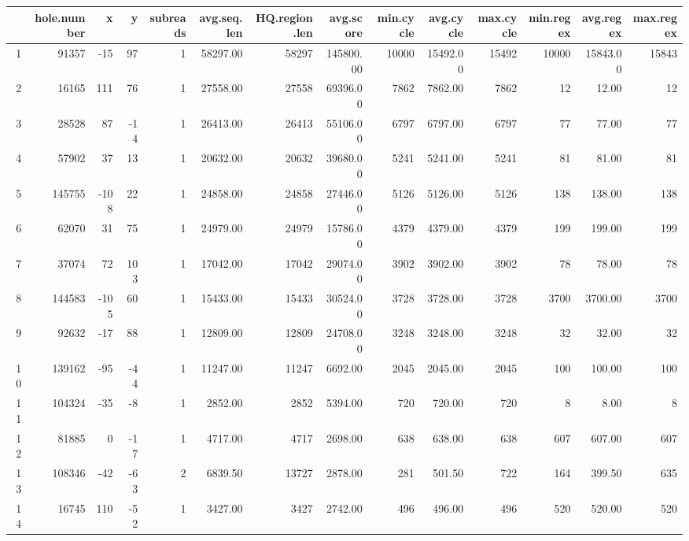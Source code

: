 \documentclass[notitlepage,a4paper]{article}\usepackage[]{graphicx}\usepackage[]{color}
\begin{document}
\begin{scriptsize}
\begin{landscape}
\begin{table}[ht]
\centering
\begin{tabular}{rrrrrrrrrrrrrr}
  \hline
 & hole.number & x & y & subreads & avg.seq.len & HQ.region.len & avg.score & min.cycle & avg.cycle & max.cycle & min.regex & avg.regex & max.regex \\ 
  \hline
1 & 91357 & -15 &  97 &   1 & 58297.00 & 58297 & 145800.00 & 10000 & 15492.00 & 15492 & 10000 & 15843.00 & 15843 \\ 
  2 & 16165 & 111 &  76 &   1 & 27558.00 & 27558 & 69396.00 & 7862 & 7862.00 & 7862 &  12 & 12.00 &  12 \\ 
  3 & 28528 &  87 & -14 &   1 & 26413.00 & 26413 & 55106.00 & 6797 & 6797.00 & 6797 &  77 & 77.00 &  77 \\ 
  4 & 57902 &  37 &  13 &   1 & 20632.00 & 20632 & 39680.00 & 5241 & 5241.00 & 5241 &  81 & 81.00 &  81 \\ 
  5 & 145755 & -108 &  22 &   1 & 24858.00 & 24858 & 27446.00 & 5126 & 5126.00 & 5126 & 138 & 138.00 & 138 \\ 
  6 & 62070 &  31 &  75 &   1 & 24979.00 & 24979 & 15786.00 & 4379 & 4379.00 & 4379 & 199 & 199.00 & 199 \\ 
  7 & 37074 &  72 & 103 &   1 & 17042.00 & 17042 & 29074.00 & 3902 & 3902.00 & 3902 &  78 & 78.00 &  78 \\ 
  8 & 144583 & -105 &  60 &   1 & 15433.00 & 15433 & 30524.00 & 3728 & 3728.00 & 3728 & 3700 & 3700.00 & 3700 \\ 
  9 & 92632 & -17 &  88 &   1 & 12809.00 & 12809 & 24708.00 & 3248 & 3248.00 & 3248 &  32 & 32.00 &  32 \\ 
  10 & 139162 & -95 & -44 &   1 & 11247.00 & 11247 & 6692.00 & 2045 & 2045.00 & 2045 & 100 & 100.00 & 100 \\ 
  11 & 104324 & -35 &  -8 &   1 & 2852.00 & 2852 & 5394.00 & 720 & 720.00 & 720 &   8 & 8.00 &   8 \\ 
  12 & 81885 &   0 & -17 &   1 & 4717.00 & 4717 & 2698.00 & 638 & 638.00 & 638 & 607 & 607.00 & 607 \\ 
  13 & 108346 & -42 & -63 &   2 & 6839.50 & 13727 & 2878.00 & 281 & 501.50 & 722 & 164 & 399.50 & 635 \\ 
  14 & 16745 & 110 & -52 &   1 & 3427.00 & 3427 & 2742.00 & 496 & 496.00 & 496 & 520 & 520.00 & 520 \\ 

\end{tabular}
\end{table}
\end{landscape}
\end{scriptsize}
\end{document}
